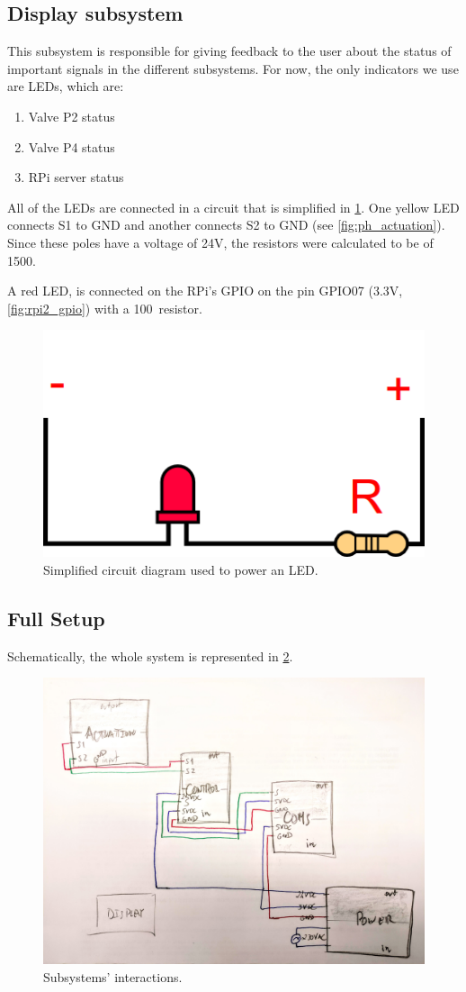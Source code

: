 \documentclass[twoside,a4paper]{refart}
\begin{document}
\subsection{Display subsystem}
This subsystem is responsible for giving feedback to the user about the status of important signals in the different subsystems. For now, the only indicators we use are LEDs, which are:
\begin{enumerate}
	\item Valve P2 status
	\item Valve P4 status
	\item RPi server status
\end{enumerate}
All of the LEDs are connected in a circuit that is simplified in \cref{fig:led_circuit}. One yellow LED connects S1 to GND and another connects S2 to GND (see \cref{fig:ph_actuation}). Since these poles have a voltage of 24V, the resistors were calculated to be of 1500\Omega.

A red LED, is connected on the RPi's GPIO on the pin GPIO07 (3.3V, \cref{fig:rpi2_gpio}) with a 100\Omega\ resistor.


\begin{figure}
	\centering
	\includegraphics[width=0.4\linewidth]{led_circuit}
	\caption{Simplified circuit diagram used to power an LED.}
	\label{fig:led_circuit}
\end{figure}


\subsection{Full Setup}\label{sub:hardware:full}
Schematically, the whole system is represented in \cref{fig:subsystem_full}.
\begin{figure}[H]
	\centering
	\includegraphics[width=1.0\linewidth]{subsystems_0}
	\caption{Subsystems' interactions.}
	\label{fig:subsystem_full}
\end{figure}
\end{document}
